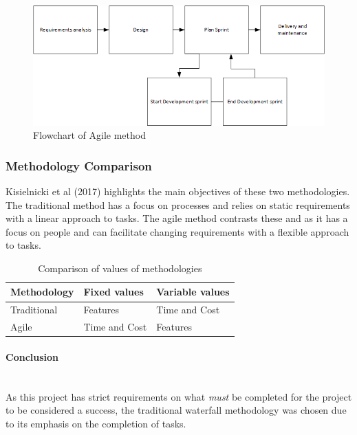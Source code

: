 \documentclass[12pt,a4paper]{article}
\begin{document}
\begin{figure}[H]
    \centering
    \includegraphics[scale=0.75]{Report/graphics/agile.png}
    \caption{Flowchart of Agile method}
    \label{fig:agile}
\end{figure}

\subsubsection{Methodology Comparison}

Kisielnicki et al (2017) highlights the main objectives of these two methodologies. The traditional method has a focus on processes and relies on static requirements with a linear approach to tasks. The agile method contrasts these and as it has a focus on people and can facilitate changing requirements with a flexible approach to tasks.

\begin{table}[H]
    \centering
    \begin{tabular}{|p{3cm}|p{4cm}|p{4cm}|}
    \hline
    Methodology & Fixed values & Variable values\\
    \hline
    Traditional & Features & Time and Cost\\
    \hline
    Agile & Time and Cost & Features \\
    \hline
    \end{tabular}
    \caption{Comparison of values of methodologies}
    \label{table:2}
\end{table}

\paragraph{Conclusion}\mbox{}\\

As this project has strict requirements on what \emph{must} be completed for the project to be considered a success, the traditional waterfall methodology was chosen due to its emphasis on the completion of tasks.
\end{document}
